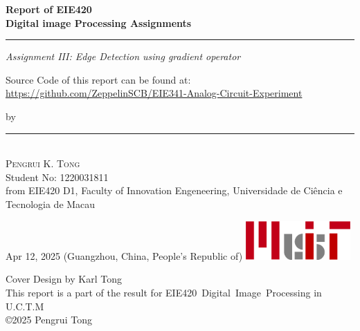 \begin{titlepage}
    \ActivateWarningFilters[latex]

    \parbox{1\textwidth}{ %
		{\Huge\bfseries Report of EIE420 \\[0.15\baselineskip] 
            Digital image Processing Assignments}\\[0.15\baselineskip] %
		\rule{1\textwidth}{1pt} %
        {\Large\textit{Assignment III: Edge Detection using gradient operator}}
        \newline
    }
    \parbox{1\textwidth}{
        \vspace{1\baselineskip}
        \large
        Source Code of this report can be found at:\newline
        \url{https://github.com/ZeppelinSCB/EIE341-Analog-Circuit-Experiment}
        \newline
    }
    \vspace{100pt} %
    \parbox{1\textwidth}{
        {\large by}\\[1.5\baselineskip]
        {\rule[1pt]{200pt}{1pt}} \\[1.25pt]
        {\huge\textsc{Pengrui K. Tong}
            }\\
        {\large{Student No: 1220031811}} \\
        \large from EIE420 D1, \newline
        Faculty of Innovation Engeneering, \newline
        Universidade de Ciência e Tecnologia de Macau
    }
		

    \vspace*{\fill}
		Apr 12, 2025 \newline 
        (Guangzhou, China, People's Republic of)
        \vspace{0.7\baselineskip}\newline
        \includegraphics[width = 40mm]{../Header/MUIT_origin.png}\par
        {\small Cover Design by Karl Tong}\\[0.25pt]
        {\small This report is a part of the result for}
        {\small EIE420~Digital~Image~Processing in U.C.T.M}\\[0.25pt]
        {\small \copyright 2025 Pengrui Tong}
\end{titlepage}